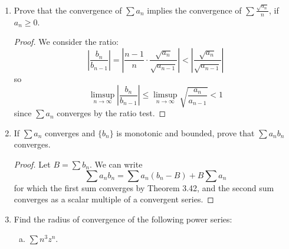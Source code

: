 \documentclass{scrbook}
\renewcommand{\to}{\rightarrow}
\begin{document}
\begin{enumerate}
\begin{enumerate}[(a)]
\item $a_n = \frac{\sqrt{n + 1} - \sqrt{n}}{n}$.

\begin{proof}
Manipulate:
\[
0 \le a_n = \frac{\sqrt{n + 1} - \sqrt{n}}{n} = \frac{(n + 1) - n}{n (\sqrt{n + 1} + \sqrt{n})} \le \frac{1}{n^{3/2}}
\]
so since $\sum n^{-3/2}$ converges, $\sum a_n$ converges by the comparison test.
\end{proof}

\item $a_n = \left(\sqrt[n]{n} - 1\right)^n$.

\begin{proof}
Since we have
\[
	\limsup_{n \to \infty} \sqrt[n]{a_n} = \limsup_{n \to \infty} \left(\sqrt[n]{n} - 1\right) = 0 < 1,
\]
the series $\sum a_n$ converges by the root test.
\end{proof}

\item $a_n = \frac{1}{1 + z^n}$ for complex $z$.

\begin{proof}
Notice that if $|z| < 1$, then $a_n \to 1 \ne 0$, so the sum does not converge. If $|z| > 1$, notice that the ratios
\[
	\left|\frac{a_n}{a_{n-1}}\right| = \left|\frac{1 + z^{n-1}}{1 + z^n}\right| \to \left|\frac{1}{z}\right| < 1
\]
so $\sum a_n$ converges by the ratio test. If $|z| = 1$, the sum diverges.
\end{proof}
\end{enumerate}

\item %
Prove that the convergence of $\sum a_n$ implies the convergence of $\sum \frac{\sqrt{a_n}}{n}$, if $a_n \ge 0$.

\begin{proof}
We consider the ratio:
\[
	\left| \frac{b_n}{b_{n-1}} \right| = \left| \frac{n-1}{n} \cdot \frac{\sqrt{a_n}}{\sqrt{a_{n-1}}} \right| < \left| \frac{\sqrt{a_n}}{\sqrt{a_{n-1}}} \right|
\]
so
\[
	\limsup_{n \to \infty} \left| \frac{b_n}{b_{n-1}} \right| \le \limsup_{n \to \infty} \sqrt{\frac{a_n}{a_{n-1}}} < 1
\]
since $\sum a_n$ converges by the ratio test.
\end{proof}

\item %
If $\sum a_n$ converges and $\{b_n\}$ is monotonic and bounded, prove that $\sum a_nb_n$ converges.

\begin{proof}
Let $B = \sum b_n$. We can write
\[
	\sum a_nb_n = \sum a_n(b_n - B) + B \sum a_n
\]
for which the first sum converges by Theorem 3.42, and the second sum converges as a scalar multiple of a convergent series.
\end{proof}
\item %
Find the radius of convergence of the following power series:
\begin{enumerate}[(a)]
\item $\sum n^3z^n$.


\end{enumerate}
\end{enumerate}
\end{document}
